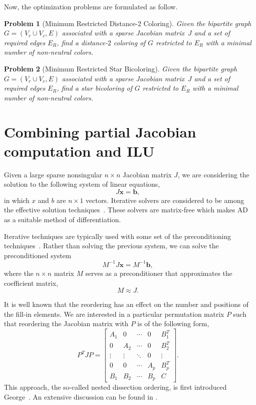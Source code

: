 \documentclass[12pt, twoside,a4paper,toc=bibliography]{scrbook}
\newtheorem{problem}{Problem}
\newcommand{\vek}[1]{{\ensuremath{\mathbf #1}}}
\begin{document}
Now, the optimization problems are formulated as follow.

\begin{problem}[Minimum Restricted Distance-$2$ Coloring]
\label{p.restricted.d2} Given the bipartite graph $G=(V_r\cup V_c, E)$
associated with a sparse Jacobian
matrix~$J$ and a set of required edges $E_R$,
find a distance-$2$ coloring of $G$ restricted to $E_R$
with a minimal number of non-neutral colors.
\end{problem}

\begin{problem}[Minimum Restricted Star Bicoloring]
\label{p.restricted.star} Given the bipartite graph $G=(V_r\cup V_c, E)$
associated with a sparse Jacobian
matrix~$J$ and a set of required edges $E_R$,
find a star bicoloring of $G$ restricted to $E_R$
with a minimal number of non-neutral colors.
\end{problem}


\section{Combining partial Jacobian computation and ILU}
\label{s.precond}
Given a large sparse nonsingular $n\times n$ Jacobian matrix $J$,
we are considering the solution to the following system of linear equations,
$$
J\vek{x} = \vek{b},
$$
in which $x$ and $b$ are $n\times 1$ vectors. 
Iterative solvers are considered to be among the effective solution techniques~\cite{ilu2003}.
These solvers are matrix-free which makes AD as a suitable method of differentiation.

Iterative techniques are typically used with some set of
the preconditioning techniques~\cite{precond1,ilu2003}.
Rather than solving the previous system,
we can solve the preconditioned system
\begin{equation}
\label{e:precond}
M^{-1} J \vek{x}= M^{-1}\vek{b},
\end{equation}
where the $n \times n$ matrix $M$ serves as a preconditioner that approximates
the coefficient matrix,
$$M \approx J.$$

It is well known \cite{ros:gra} that the reordering has an effect on the number and positions of
the fill-in elements. We are interested in a particular permutation matrix $P$ such that
reordering the Jacobian matrix with $P$ is of the following form,
$$
P^T J P =
\begin{bmatrix}
A_1 & 0   & \cdots & 0 & B_1^T \\
0   & A_2 & \cdots & 0  & B_2^T \\
\vdots& \vdots & \ddots & 0 & \vdots \\
0   &   0 & \cdots & A_p & B_p^T \\
B_1 & B_2 & \cdots & B_p& C
\end{bmatrix} .
$$
This approach, the so-called nested dissection ordering, is first 
introduced George~\cite{nested_diss1}. An extensive discussion 
can be found in \cite{ilu_ordering4}.
\end{document}
